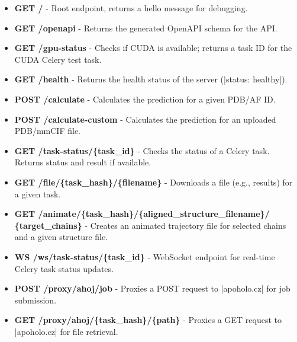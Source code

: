 \begin{itemize}
    \item \textbf{GET /} - Root endpoint, returns a hello message for debugging.
    \item \textbf{GET /openapi} - Returns the generated OpenAPI schema for the API.
    \item \textbf{GET /gpu-status} - Checks if CUDA is available; returns a task ID for the CUDA Celery test task.
    \item \textbf{GET /health} - Returns the health status of the server (\inline|status: healthy|).
    \item \textbf{POST /calculate} - Calculates the prediction for a given PDB/AF ID.
    \item \textbf{POST /calculate-custom} - Calculates the prediction for an uploaded PDB/mmCIF file.
    \item \textbf{GET /task-status/\{task\_id\}} - Checks the status of a Celery task. Returns status and result if available.
    \item \textbf{GET /file/\{task\_hash\}/\{filename\}} - Downloads a file (e.g., results) for a given task.
    \item \textbf{GET /animate/\{task\_hash\}/\{aligned\_structure\_filename\}/} \textbf{\{target\_chains\}} - Creates an animated trajectory file for selected chains and a given structure file.
    \item \textbf{WS /ws/task-status/\{task\_id\}} - WebSocket endpoint for real-time Celery task status updates.
    \item \textbf{POST /proxy/ahoj/job} - Proxies a POST request to \inline|apoholo.cz| for job submission.
    \item \textbf{GET /proxy/ahoj/\{task\_hash\}/\{path\}} - Proxies a GET request to \inline|apoholo.cz| for file retrieval.
\end{itemize}
